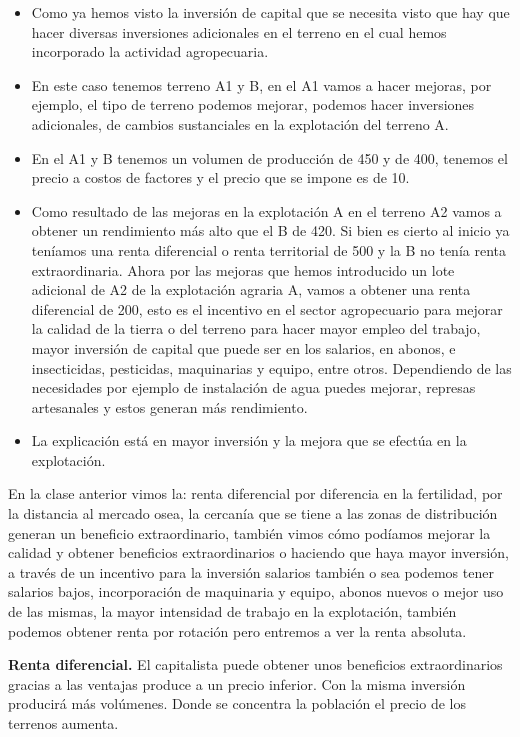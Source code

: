 \documentclass[
  a4paper,
]{article}
\begin{document}
\begin{itemize}
\item
  Como ya hemos visto la inversión de capital que se necesita visto que
  hay que hacer diversas inversiones adicionales en el terreno en el
  cual hemos incorporado la actividad agropecuaria.
\item
  En este caso tenemos terreno A1 y B, en el A1 vamos a hacer mejoras,
  por ejemplo, el tipo de terreno podemos mejorar, podemos hacer
  inversiones adicionales, de cambios sustanciales en la explotación del
  terreno A.
\item
  En el A1 y B tenemos un volumen de producción de 450 y de 400, tenemos
  el precio a costos de factores y el precio que se impone es de 10.
\item
  Como resultado de las mejoras en la explotación A en el terreno A2
  vamos a obtener un rendimiento más alto que el B de 420. Si bien es
  cierto al inicio ya teníamos una renta diferencial o renta territorial
  de 500 y la B no tenía renta extraordinaria. Ahora por las mejoras que
  hemos introducido un lote adicional de A2 de la explotación agraria A,
  vamos a obtener una renta diferencial de 200, esto es el incentivo en
  el sector agropecuario para mejorar la calidad de la tierra o del
  terreno para hacer mayor empleo del trabajo, mayor inversión de
  capital que puede ser en los salarios, en abonos, e insecticidas,
  pesticidas, maquinarias y equipo, entre otros. Dependiendo de las
  necesidades por ejemplo de instalación de agua puedes mejorar,
  represas artesanales y estos generan más rendimiento.
\item
  La explicación está en mayor inversión y la mejora que se efectúa en
  la explotación.
\end{itemize}

En la clase anterior vimos la: renta diferencial por diferencia en la
fertilidad, por la distancia al mercado osea, la cercanía que se tiene a
las zonas de distribución generan un beneficio extraordinario, también
vimos cómo podíamos mejorar la calidad y obtener beneficios
extraordinarios o haciendo que haya mayor inversión, a través de un
incentivo para la inversión salarios también o sea podemos tener
salarios bajos, incorporación de maquinaria y equipo, abonos nuevos o
mejor uso de las mismas, la mayor intensidad de trabajo en la
explotación, también podemos obtener renta por rotación pero entremos a
ver la renta absoluta.

\textbf{Renta diferencial.} El capitalista puede obtener unos beneficios
extraordinarios gracias a las ventajas produce a un precio inferior. Con
la misma inversión producirá más volúmenes. Donde se concentra la
población el precio de los terrenos aumenta.
\end{document}
